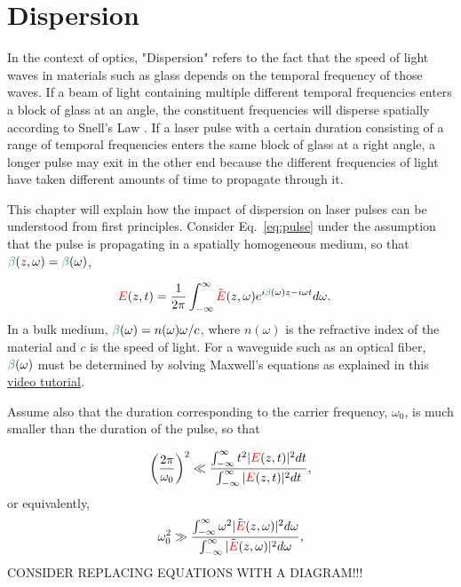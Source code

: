 \chapter{Dispersion}
\label{ch:Dispersion}
In the context of optics, "Dispersion" refers to the fact that the speed of light waves in materials such as glass depends on the temporal frequency of those waves. If a beam of light containing multiple different temporal frequencies enters a block of glass at an angle, the constituent frequencies will disperse spatially according to Snell's Law \CITE. If a laser pulse with a certain duration consisting of a range of temporal frequencies enters the same block of glass at a right angle, a longer pulse may exit in the other end because the different frequencies of light have taken different amounts of time to propagate through it. 

This chapter will explain how the impact of dispersion on laser pulses can be understood from first principles. Consider Eq.~\ref{eq:pulse} under the assumption that the pulse is propagating in a spatially homogeneous medium, so that $\betag(z,\omega)=\betag(\omega)$,

\begin{align}
\label{eq:spatially_uniform}
    \E(z,t) &= \frac{1}{2\pi}\int_{-\infty}^{\infty} \Tilde{\E}(z,\omega) e^{i\betag(\omega)z-i\omega t} d\omega.
\end{align}
In a bulk medium, $\betag(\omega)=n(\omega)\omega/c$, where $n(\omega)$ is the refractive index of the material and $c$ is the speed of light. For a waveguide such as an optical fiber, $\betag(\omega)$ must be determined by solving Maxwell's equations as explained in this \href{https://youtu.be/z7fyT3etgis}{video tutorial}.

Assume also that the duration corresponding to the carrier frequency, $\omega_0$, is much smaller than the duration of the pulse, so that 

\begin{align}
\label{eq:long_duration}
\left(\frac{2\pi}{\omega_0}\right)^2\ll  \frac{\int_{-\infty}^{\infty} t^2|\textcolor{red}{E}(z,t)|^2 dt}{\int_{-\infty}^{\infty}|\textcolor{red}{E}(z,t)|^2dt},       
\end{align}
or equivalently,
\begin{align}
\label{eq:limited_bandwidth}
\omega_0^2\gg  \frac{\int_{-\infty}^{\infty} \omega^2|\Tilde{\textcolor{red}{E}}(z,\omega)|^2 d\omega}{\int_{-\infty}^{\infty}|\Tilde{\textcolor{red}{E}}(z,\omega)|^2 d\omega},       
\end{align}
CONSIDER REPLACING EQUATIONS WITH A DIAGRAM!!!

